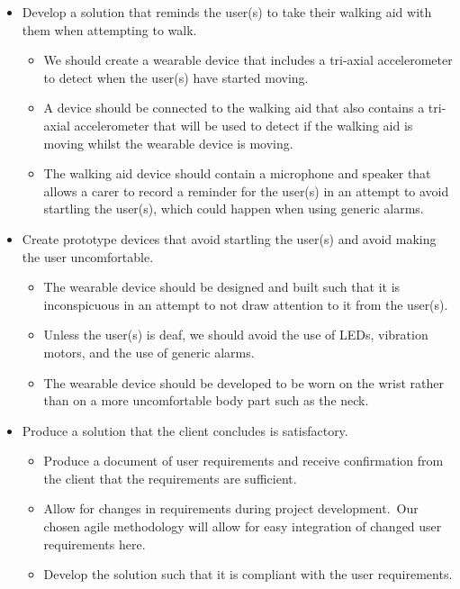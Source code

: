         \begin{itemize}
            \item Develop a solution that reminds the user(s) to take their walking aid with them when attempting to walk.
            \begin{itemize}
                \item We should create a wearable device that includes a tri-axial accelerometer to detect when the
                    user(s) have started moving.
                \item A device should be connected to the walking aid that also contains a tri-axial accelerometer that
                    will be used to detect if the walking aid is moving whilst the wearable device is moving.
                \item The walking aid device should contain a microphone and speaker that allows a carer to record a
                    reminder for the user(s) in an attempt to avoid startling the user(s), which could happen when using
                    generic alarms.
            \end{itemize}
            \item Create prototype devices that avoid startling the user(s) and avoid making the user uncomfortable.
            \begin{itemize}
                \item The wearable device should be designed and built such that it is inconspicuous in an attempt
                    to not draw attention to it from the user(s).
                \item Unless the user(s) is deaf, we should avoid the use of LEDs, vibration motors, and the use
                    of generic alarms.
                \item The wearable device should be developed to be worn on the wrist rather than on a more
                    uncomfortable body part such as the neck.
            \end{itemize}
            \item Produce a solution that the client concludes is satisfactory.
            \begin{itemize}
                \item Produce a document of user requirements and receive confirmation from the
                    client that the requirements are sufficient.
                \item Allow for changes in requirements during project
                    development.\ Our chosen agile methodology will allow for easy integration of changed user
                    requirements here.
                \item Develop the solution such that it is compliant with the user requirements.
                    \end{itemize}
        \end{itemize}
